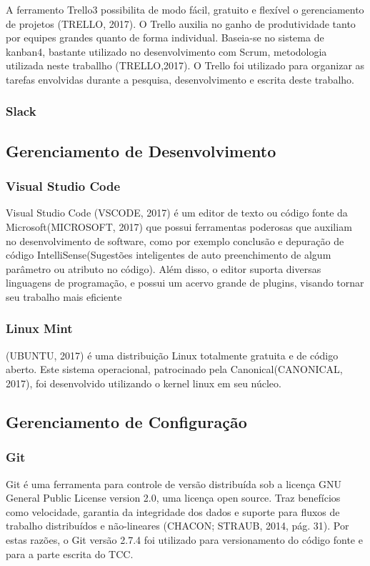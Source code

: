 A ferramento Trello3 possibilita de modo fácil, gratuito e flexível o gerenciamento de projetos (TRELLO, 2017). O Trello auxilia no ganho de produtividade tanto por equipes grandes quanto de forma individual. Baseia-se no sistema de kanban4, bastante utilizado no desenvolvimento com Scrum, metodologia utilizada neste traballho (TRELLO,2017). O Trello foi utilizado para organizar as tarefas envolvidas durante a pesquisa, desenvolvimento e escrita deste trabalho.

\subsubsection{Slack}

\subsection{Gerenciamento de Desenvolvimento}

\subsubsection{Visual Studio Code}

Visual Studio Code (VSCODE, 2017) é um editor de texto ou código fonte da Microsoft(MICROSOFT, 2017) que possui ferramentas poderosas que auxiliam no desenvolvimento de software, como por exemplo conclusão e depuração de código IntelliSense(Sugestões inteligentes de auto preenchimento de algum parâmetro ou atributo no código). Além disso, o editor suporta diversas linguagens de programação, e possui um acervo grande de plugins, visando tornar seu trabalho mais eficiente

\subsubsection{Linux Mint}
(UBUNTU, 2017) é uma distribuição Linux totalmente gratuita e de código aberto. Este sistema operacional, patrocinado pela Canonical(CANONICAL, 2017), foi desenvolvido utilizando o kernel linux em seu núcleo.

\subsection{Gerenciamento de Configuração}

\subsubsection{Git}
Git é uma ferramenta para controle de versão distribuída sob a licença GNU General Public License version 2.0, uma licença open source. Traz benefícios como velocidade, garantia da integridade dos dados e suporte para fluxos de trabalho distribuídos e não-lineares (CHACON; STRAUB, 2014, pág. 31). Por estas razões, o Git versão 2.7.4 foi utilizado para versionamento do código fonte e para a parte escrita do TCC.


